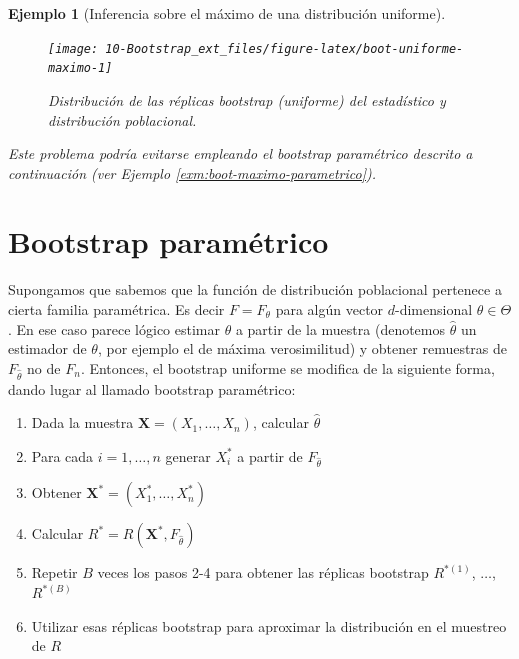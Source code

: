 \documentclass[
]{book}
\theoremstyle{break}
\newtheorem{example}{Ejemplo}[chapter]
\theoremstyle{nonumberplain}
\begin{document}
\begin{example}[Inferencia sobre el máximo de una distribución uniforme]
\begin{figure}[!htb]

{\centering \texttt{[image: 10-Bootstrap\_ext\_files/figure-latex/boot-uniforme-maximo-1]} 

}

\caption{Distribución de las réplicas bootstrap (uniforme) del estadístico y distribución poblacional.}\label{fig:boot-uniforme-maximo}
\end{figure}

Este problema podría evitarse empleando el bootstrap paramétrico descrito a continuación (ver Ejemplo \ref{exm:boot-maximo-parametrico}).
\end{example}

\hypertarget{modunif-boot-par}{%
\section{Bootstrap paramétrico}\label{modunif-boot-par}}

Supongamos que sabemos que la función de distribución poblacional
pertenece a cierta familia paramétrica. Es decir \(F=F_{\theta }\) para
algún vector \(d\)-dimensional \(\theta \in \Theta\). En ese caso parece
lógico estimar \(\theta\) a partir de la muestra (denotemos
\(\hat{\theta}\) un estimador de \(\theta\), por ejemplo el de máxima
verosimilitud) y obtener remuestras de \(F_{\hat{\theta}}\) no de \(F_n\).
Entonces, el bootstrap uniforme se modifica de la siguiente forma, dando
lugar al llamado bootstrap paramétrico:

\begin{enumerate}
\def\labelenumi{\arabic{enumi}.}
\item
  Dada la muestra
  \(\mathbf{X}=\left( X_1,\ldots ,X_n \right)\), calcular \(\hat{\theta}\)
\item
  Para cada \(i=1,\ldots ,n\) generar \(X_i^{\ast}\) a partir de \(F_{\hat{\theta}}\)
\item
  Obtener \(\mathbf{X}^{\ast}=\left( X_1^{\ast},\ldots ,X_n^{\ast} \right)\)
\item
  Calcular \(R^{\ast}=R\left( \mathbf{X}^{\ast},F_{\hat{\theta}} \right)\)
\item
  Repetir \(B\) veces los pasos 2-4 para obtener las réplicas bootstrap
  \(R^{\ast (1)}\), \(\ldots\), \(R^{\ast (B)}\)
\item
  Utilizar esas réplicas bootstrap para aproximar la distribución en el muestreo de \(R\)
\end{enumerate}
\end{document}
